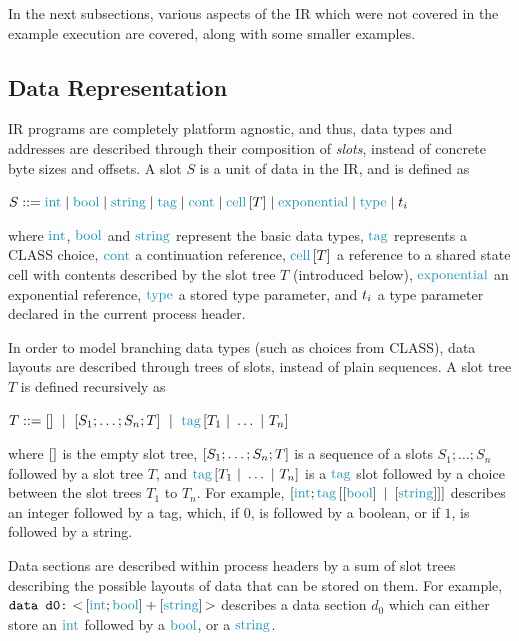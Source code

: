 In the next subsections, various aspects of the \ac{IR} which were not covered in the example execution are covered, along with some smaller examples.

\subsection{Data Representation} \label{subsection:IRSlots}

\ac{IR} programs are completely platform agnostic, and thus, data types and addresses are described through their composition of \textit{slots}, instead of concrete byte sizes and offsets. A slot $S$ is a unit of data in the \ac{IR}, and is defined as\vspace{2pt}\\
\vspace{2pt}\centerline{$
S ::= \ints \mid \bools \mid \strings \mid \tags \mid \conts \mid \cells{T} \mid \exponentials \mid \types \mid \vars{i}$}
where $\ints$, $\bools$ and $\strings$ represent the basic data types, $\tags$ represents a \ac{CLASS} choice, $\conts$ a continuation reference, $\cells{T}$ a reference to a shared state cell with contents described by the slot tree $T$ (introduced below), $\exponentials$ an exponential reference, $\types$ a stored type parameter, and $t_{i}$ a type parameter declared in the current process header. 

In order to model branching data types (such as choices from \ac{CLASS}), data layouts are described through trees of slots, instead of plain sequences. A slot tree $T$ is defined recursively as \vspace{2pt}\\
\vspace{2pt}\centerline{$
T ::= \nilst \ \mid\ \seqst{S_1; \dots; S_n; T}\ \mid\ \tagst{T_1 \tagsepst \dots \tagsepst T_n}
$}
where $\left[\right]$ is the empty slot tree, $\left[S_1; \dots; S_n; T\right]$ is a sequence of a slots $S_1; \dots; S_n$ followed by a slot tree $T$, and $\tagst{T_1 \tagsepst \dots \tagsepst T_n}$ is a $\tags$ slot followed by a choice between the slot trees $T_1$ to $T_n$. For example, $\seqst{\ints; \tagst{\seqst{\bools} \tagsepst \seqst{\strings}}}$ describes an integer followed by a tag, which, if $0$, is followed by a boolean, or if $1$, is followed by a string.

Data sections are described within process headers by a sum of slot trees describing the possible layouts of data that can be stored on them. For example, $\texttt{data d0:}\ \combst{\seqst{\ints; \bools} + \seqst{\strings}}$ describes a data section $d_0$ which can either store an $\ints$ followed by a $\bools$, or a $\strings$.

